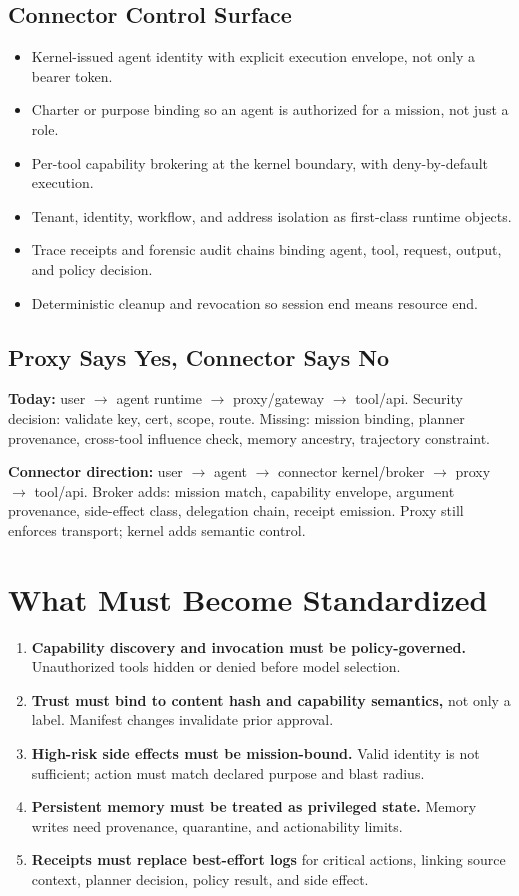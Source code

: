\documentclass[10pt]{article}
\begin{document}
\subsection{Connector Control Surface}
\begin{itemize}
  \item Kernel-issued agent identity with explicit execution envelope, not only a bearer token.
  \item Charter or purpose binding so an agent is authorized for a mission, not just a role.
  \item Per-tool capability brokering at the kernel boundary, with deny-by-default execution.
  \item Tenant, identity, workflow, and address isolation as first-class runtime objects.
  \item Trace receipts and forensic audit chains binding agent, tool, request, output, and policy decision.
  \item Deterministic cleanup and revocation so session end means resource end.
\end{itemize}

\subsection{Proxy Says Yes, Connector Says No}
\textbf{Today:} user $\rightarrow$ agent runtime $\rightarrow$ proxy/gateway $\rightarrow$ tool/api. Security decision: validate key, cert, scope, route. Missing: mission binding, planner provenance, cross-tool influence check, memory ancestry, trajectory constraint.

\textbf{Connector direction:} user $\rightarrow$ agent $\rightarrow$ connector kernel/broker $\rightarrow$ proxy $\rightarrow$ tool/api. Broker adds: mission match, capability envelope, argument provenance, side-effect class, delegation chain, receipt emission. Proxy still enforces transport; kernel adds semantic control.

\section{What Must Become Standardized}
\begin{enumerate}
  \item \textbf{Capability discovery and invocation must be policy-governed.} Unauthorized tools hidden or denied before model selection.
  \item \textbf{Trust must bind to content hash and capability semantics,} not only a label. Manifest changes invalidate prior approval.
  \item \textbf{High-risk side effects must be mission-bound.} Valid identity is not sufficient; action must match declared purpose and blast radius.
  \item \textbf{Persistent memory must be treated as privileged state.} Memory writes need provenance, quarantine, and actionability limits.
  \item \textbf{Receipts must replace best-effort logs} for critical actions, linking source context, planner decision, policy result, and side effect.
\end{enumerate}
\end{document}
